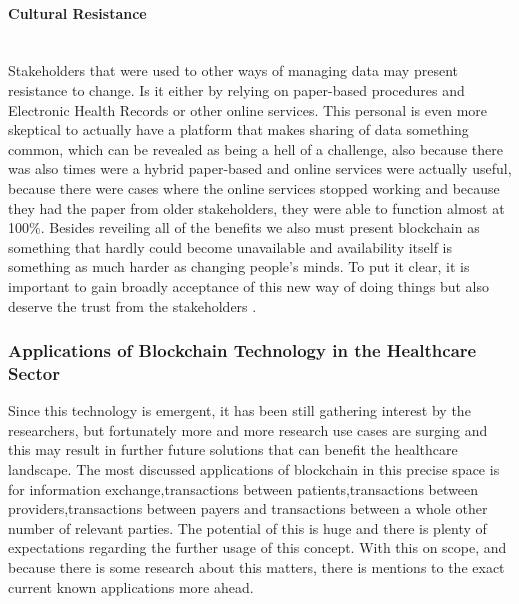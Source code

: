 \paragraph{Cultural Resistance} \mbox{}\\
Stakeholders that were used to other ways of managing data may present resistance to change. Is it either by relying on 
paper-based procedures and Electronic Health Records or other online services. This personal is even more skeptical to actually 
have a platform that makes sharing of data something common, which can be revealed as being a hell of a challenge, also because 
there was also times were a hybrid paper-based and online services were actually useful, because there were cases where the online 
services stopped working and because they had the paper from older stakeholders, they were able to function almost at 100\%. Besides 
reveiling all of the benefits we also must present blockchain as something that hardly could become unavailable and availability 
itself is something as much harder as changing people's minds. To put it clear, it is important to gain broadly acceptance of this 
new way of doing things but also deserve the trust from the stakeholders \cite{cultural-resistance}.

\subsubsection{Applications of Blockchain Technology in the Healthcare Sector}
Since this technology is emergent, it has been still gathering interest by the researchers, but fortunately more and more 
research use cases are surging and this may result in further future solutions that can benefit the healthcare landscape. The most 
discussed applications of blockchain in this precise space is for information exchange,transactions between patients,transactions 
between providers,transactions between payers and transactions between a whole other number of relevant parties. The potential of this 
is huge and there is plenty of expectations regarding the further usage of this concept.
With this on scope, and because there is some research about this matters, there is mentions to the exact current known applications 
more ahead.

